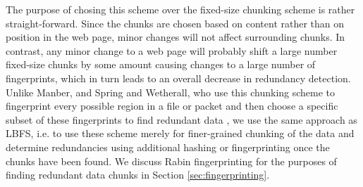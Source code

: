 The purpose of chosing this scheme over the fixed-size chunking scheme is rather straight-forward. Since the chunks are chosen based on content rather than on position in the web page, minor changes will not affect surrounding chunks. In contrast, any minor change to a web page will probably shift a large number fixed-size chunks by some amount causing changes to a large number of fingerprints, which in turn leads to an overall decrease in redundancy detection. Unlike Manber, and Spring and Wetherall, who use this chunking scheme to fingerprint every possible region in a file or packet and then choose a specific subset of these fingerprints to find redundant data \cite{manber,spring}, we use the same approach as LBFS, i.e. to use these scheme merely for finer-grained chunking of the data and determine redundancies using additional hashing or fingerprinting once the chunks have been found. We discuss Rabin fingerprinting for the purposes of finding redundant data chunks in Section \ref{sec:fingerprinting}. 


